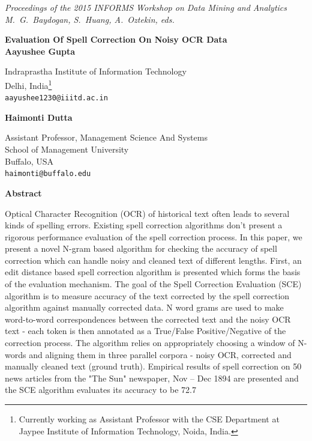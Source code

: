 \documentclass[12pt]{article}
\begin{document}
\noindent
\footnotesize{
\noindent
\textit{Proceedings of the 2015 INFORMS Workshop on Data Mining and Analytics\\
\noindent
M.~G.~Baydogan, S.~Huang, A.~Oztekin, eds.}}

\vspace{0.1in}
\begin{center}
    {\large\bf Evaluation Of Spell Correction On Noisy OCR Data}\\
    \vspace{0.3in}
\textbf{Aayushee Gupta}

Indraprastha Institute of Information Technology\\
Delhi, India\footnote{Currently working as Assistant Professor with the CSE Department at Jaypee Institute of Information Technology, Noida, India.}\\
\texttt{aayushee1230@iiitd.ac.in}\\
\vspace{0.2in}

\textbf{Haimonti Dutta}

Assistant Professor, Management Science And Systems\\
School of Management University\\
Buffalo, USA\\
\texttt{haimonti@buffalo.edu}\\
\end{center}


\begin{center}
    {\bf Abstract}\\

\end{center}
\noindent
Optical Character Recognition (OCR) of historical text often leads to several kinds of spelling errors. Existing spell correction algorithms don't present a rigorous performance evaluation of the spell correction process. In this paper, we present a novel N-gram based algorithm for checking the accuracy of spell correction which can handle noisy and cleaned text of different lengths. First, an edit distance based spell correction algorithm is presented which forms the basis of the evaluation mechanism. The goal of the Spell Correction Evaluation (SCE) algorithm is to measure accuracy of the text corrected by the spell correction algorithm against manually corrected data. N word grams are used to make word-to-word correspondences between the corrected text and the noisy OCR text - each token is then annotated as a True/False Positive/Negative of the correction process. The algorithm relies on appropriately choosing a window of N-words and aligning them in three parallel corpora - noisy OCR, corrected and manually cleaned text (ground truth). Empirical results of spell correction on 50 news articles from the "The Sun" newspaper, Nov – Dec 1894 are presented and the SCE algorithm evaluates its accuracy to be 72.7%
\end{document}
